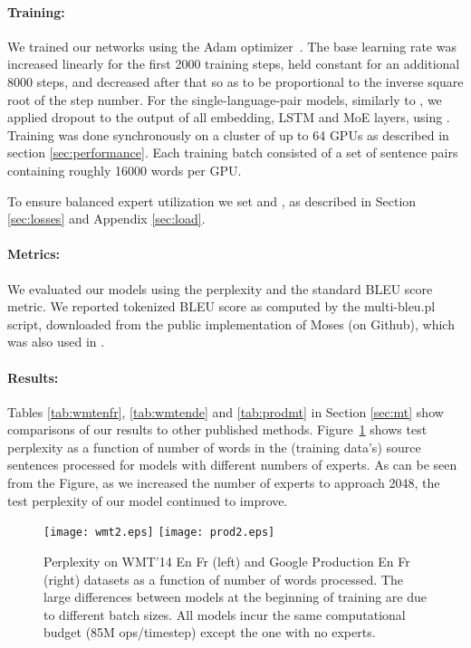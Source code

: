 \documentclass{article} \pdfoutput=1
\begin{document}
\paragraph{Training:} We trained our networks using the Adam optimizer~\citep{kingma2014adam}. The base learning rate was increased linearly for the first 2000 training steps, held constant for an additional 8000 steps, and decreased after that so as to be proportional to the inverse square root of the step number.  For the single-language-pair models, similarly to \citep{GNMT}, we applied dropout \citep{ZarembaSV14} to the output of all embedding, LSTM and MoE layers, using .  Training was done synchronously on a cluster of up to 64 GPUs as described in section \ref{sec:performance}.  Each training batch consisted of a set of sentence pairs containing roughly 16000 words per GPU.

To ensure balanced expert utilization we set  and , as described in Section \ref{sec:losses} and Appendix \ref{sec:load}.


\paragraph{Metrics:} We evaluated our models using the perplexity and the standard BLEU score metric. We reported tokenized BLEU score as computed by the multi-bleu.pl script, downloaded from the public implementation of Moses (on Github), which was also used in \citep{LuongPM:2015:EAANMT}. 

\paragraph{Results:} Tables \ref{tab:wmtenfr}, \ref{tab:wmtende} and \ref{tab:prodmt} in Section \ref{sec:mt} show comparisons of our results to other published methods.  Figure~\ref{fig:mt} shows test perplexity as a function of number of words in the (training data's) source sentences processed for models with different numbers of experts.  As can be seen from the Figure, as we increased the number of experts to approach 2048, the test perplexity of our model continued to improve. 

\begin{figure}[h!]
\centering
    \texttt{[image: wmt2.eps]}
    \texttt{[image: prod2.eps]}
    \caption{Perplexity on WMT'14 En Fr (left) and Google Production En Fr (right) datasets as a function of number of words processed.  The large differences between models at the beginning of training are due to different batch sizes.  All models incur the same computational budget (85M ops/timestep) except the one with no experts.}
    \label{fig:mt}
\end{figure}
\end{document}
